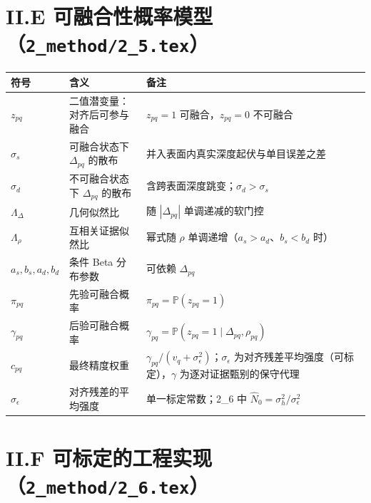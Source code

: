 \documentclass[11pt]{ctexart}
\begin{document}
\section*{II.E 可融合性概率模型（\texttt{2\_method/2\_5.tex}）}

\begin{center}
\begin{tabular}{@{}llp{}@{}}
\toprule
符号 & 含义 & 备注 \\
\midrule
$z_{pq}$ & 二值潜变量：对齐后可参与融合 & $z_{pq}=1$ 可融合，$z_{pq}=0$ 不可融合 \\
$\sigma_s$ & 可融合状态下 $\Delta_{pq}$ 的散布 & 并入表面内真实深度起伏与单目误差之差 \\
$\sigma_d$ & 不可融合状态下 $\Delta_{pq}$ 的散布 & 含跨表面深度跳变；$\sigma_d>\sigma_s$ \\
$\Lambda_{\Delta}$ & 几何似然比 & 随 $|\Delta_{pq}|$ 单调递减的软门控 \\
$\Lambda_{\rho}$ & 互相关证据似然比 & 幂式随 $\rho$ 单调递增（$a_s>a_d$、$b_s<b_d$ 时） \\
$a_s,b_s,a_d,b_d$ & 条件 Beta 分布参数 & 可依赖 $\Delta_{pq}$ \\
$\pi_{pq}$ & 先验可融合概率 & $\pi_{pq}=\mathbb{P}(z_{pq}=1)$ \\
$\gamma_{pq}$ & 后验可融合概率 & $\gamma_{pq}=\mathbb{P}(z_{pq}=1\mid\Delta_{pq},\rho_{pq})$ \\
$c_{pq}$ & 最终精度权重 & $\gamma_{pq}/(v_q+\sigma_\epsilon^2)$；$\sigma_\epsilon$ 为对齐残差平均强度（可标定），$\gamma$ 为逐对证据甄别的保守代理 \\
$\sigma_\epsilon$ & 对齐残差的平均强度 & 单一标定常数；2\_6 中 $\hat N_0=\sigma_h^2/\sigma_\epsilon^2$ \\
\bottomrule
\end{tabular}
\end{center}

\section*{II.F 可标定的工程实现（\texttt{2\_method/2\_6.tex}）}
\end{document}

